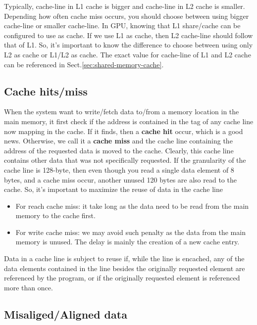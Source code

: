 Typically, cache-line in L1 cache is bigger and cache-line in L2 cache is
smaller. Depending how often cache miss occurs, you should choose between using
bigger cache-line or smaller cache-line. In GPU, knowing that L1 share/cache can be configured to
use as cache. If we use L1 as cache, then L2 cache-line should follow that of
L1. So, it's important to know the difference to choose between using only L2 as
cache or L1/L2 as cache. The exact value for cache-line of L1 and L2 cache can
be referenced in Sect.\ref{sec:shared-memory-cache}.

\subsection{Cache hits/miss}

When the system want to write/fetch data to/from a memory location in
the main memory, it first check if the address is contained in the tag
of any cache line now mapping in the cache. If it finds, then a
{\bf cache hit} occur, which is a good news. Otherwise, we call it a
{\bf cache miss} and the cache line containing the address of the
requested data is moved to the cache. Clearly, this cache line
contains other data that was not specifically requested. If the
granularity of the cache line is 128-byte, then even though you read a
single data element of 8 bytes, and a cache miss occur, another unused
120 bytes are also read to the cache. So, it's important to maximize
the reuse of data in the cache line 

\begin{itemize}
\item For reach cache miss: it take long as the data need to be read
  from the main memory to the cache first.
\item For write cache miss: we may avoid such penalty as the data from
  the main memory is unused. The delay is mainly the creation of a new
  cache entry. 
\end{itemize}

\begin{framed}
  Data in a cache line is subject to reuse if, while the line is
  encached, any of the data elements contained in the line besides the
  originally requested element are referenced by the program, or if the
  originally requested element is referenced more than once.
\end{framed}


\subsection{Misaliged/Aligned data}

